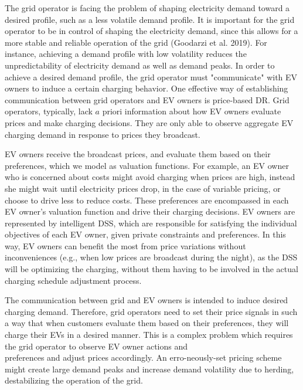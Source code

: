 \documentclass[10pt]{article}
\begin{document}
The grid operator is facing the problem of shaping electricity demand toward a desired profile, such as a less volatile demand profile. It is important for the grid operator to be in control of shaping the electricity demand, since this allows for a more stable and reliable operation of the grid (Goodarzi et al. 2019). For instance, achieving a demand profile with low volatility reduces the unpredictability of electricity demand as well as demand peaks. In order to achieve a desired demand profile, the grid operator must "communicate" with EV owners to induce a certain charging behavior. One effective way of establishing communication between grid operators and EV owners is price-based DR. Grid operators, typically, lack $a$ priori information about how EV owners evaluate prices and make charging decisions. They are only able to observe aggregate EV charging demand in response to prices they broadcast.

EV owners receive the broadcast prices, and evaluate them based on their preferences, which we model as valuation functions. For example, an EV owner who is concerned about costs might avoid charging when prices are high, instead she might wait until electricity prices drop, in the case of variable pricing, or choose to drive less to reduce costs. These preferences are encompassed in each EV owner's valuation function and drive their charging decisions. EV owners are represented by intelligent DSS, which are responsible for satisfying the individual objectives of each EV owner, given private constraints and preferences. In this way, EV owners can benefit the most from price variations without inconveniences (e.g., when low prices are broadcast during the night), as the DSS will be optimizing the charging, without them having to be involved in the actual charging schedule adjustment process.

The communication between grid and EV owners is intended to induce desired charging demand. Therefore, grid operators need to set their price signals in such a way that when customers evaluate them based on their preferences, they will charge their EVs in a desired manner. This is a complex problem which requires the grid operator to observe EV owner actions and\\
preferences and adjust prices accordingly. An erro-neously-set pricing scheme might create large demand peaks and increase demand volatility due to herding, destabilizing the operation of the grid.
\end{document}
